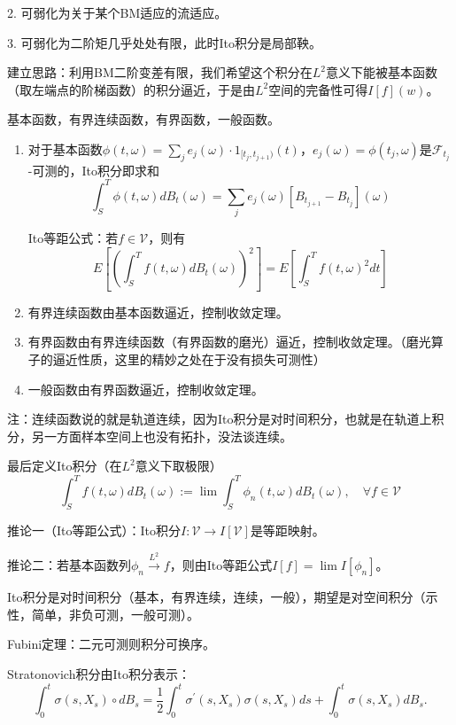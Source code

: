 2. 可弱化为关于某个BM适应的流适应。

3. 可弱化为二阶矩几乎处处有限，此时Ito积分是局部鞅。

建立思路：利用BM二阶变差有限，我们希望这个积分在$L^2$意义下能被基本函数（取左端点的阶梯函数）的积分逼近，于是由$L^2$空间的完备性可得$I[f](w)$。

基本函数，有界连续函数，有界函数，一般函数。

\begin{enumerate}
  \item 对于基本函数$\phi(t, \omega)=\sum_{j} e_{j}(\omega) \cdot 1_{[t_{j}, t_{j+1})}(t)$，$e_j(\omega) = \phi(t_j, \omega)$是$\mathcal{F}_{t_j}$-可测的，Ito积分即求和
  \[
    \int_{S}^{T} \phi(t, \omega) d B_{t}(\omega)=\sum_{j} e_{j}(\omega)\left[B_{t_{j+1}}-B_{t_{j}}\right](\omega)
  \]
  
  Ito等距公式：若$f \in \mathcal{V}$，则有
  \[
    E\left[\left(\int_{S}^{T} f(t, \omega) d B_{t}(\omega)\right)^{2}\right]=E\left[\int_{S}^{T} f(t, \omega)^{2} d t\right]
  \]

  \item 有界连续函数由基本函数逼近，控制收敛定理。
  \item 有界函数由有界连续函数（有界函数的磨光）逼近，控制收敛定理。（磨光算子的逼近性质，这里的精妙之处在于没有损失可测性）
  \item 一般函数由有界函数逼近，控制收敛定理。
\end{enumerate}

注：连续函数说的就是轨道连续，因为Ito积分是对时间积分，也就是在轨道上积分，另一方面样本空间上也没有拓扑，没法谈连续。

最后定义Ito积分（在$L^2$意义下取极限）
\[
  \int_{S}^{T} f(t, \omega) d B_{t}(\omega):=\lim \int_{S}^{T} \phi_{n}(t, \omega) d B_{t}(\omega), \quad \forall f \in \mathcal{V}
\]

推论一（Ito等距公式）：Ito积分$I: \mathcal{V} \to I[\mathcal{V}]$是等距映射。

推论二：若基本函数列$\phi_n \overset{L^2}{\to} f$，则由Ito等距公式$I[f] = \lim I[\phi_n]$。

Ito积分是对时间积分（基本，有界连续，连续，一般），期望是对空间积分（示性，简单，非负可测，一般可测）。

Fubini定理：二元可测则积分可换序。

Stratonovich积分由Ito积分表示：
\[
  \int_{0}^{t} \sigma(s, X_{s}) \circ d B_{s} = \frac{1}{2} \int_{0}^{t} \sigma^{\prime}(s, X_{s}) \sigma(s, X_{s}) d s+\int_{0}^{t} \sigma(s, X_{s}) d B_{s}.
\]


